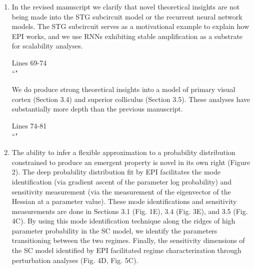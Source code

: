 \documentclass[11pt,a4paper]{article}
\begin{document}
\begin{enumerate}[label=(\alph*)]
\item  In the revised manuscript we clarify that novel theoretical insights are not being made into the STG subcircuit model or the recurrent neural network models.  The STG subcircuit serves as a motivational example to explain how EPI works, and we use RNNs exhibiting stable amplification as a substrate for scalability analyses.  

\begin{displayquote}
Lines 69-74 \\
``"
\end{displayquote}

We do produce strong theoretical insights into a model of primary visual cortex (Section 3.4) and superior colliculus (Section 3.5).  These analyses have substantially more depth than the previous manuscript.

\begin{displayquote}
Lines 74-81 \\
``"
\end{displayquote}

\item The ability to infer a flexible approximation to a probability distribution constrained to produce an emergent property is novel in its own right (Figure 2).  The deep probability distribution fit by EPI facilitates the mode identification (via gradient ascent of the parameter log probability) and sensitivity measurement (via the measurement of the eigenvector of the Hessian at a parameter value). These mode identifications and sensitivity measurements are done in Sections 3.1 (Fig. 1E), 3.4 (Fig. 3E), and 3.5 (Fig. 4C).  By using this mode identification technique along the ridges of high parameter probability in the SC model, we identify the parameters transitioning between the two regimes.  Finally, the sensitivity dimensions of the SC model identified by EPI facilitated regime characterization through perturbation analyses (Fig. 4D, Fig. 5C).
 
\end{enumerate}
\end{document}
